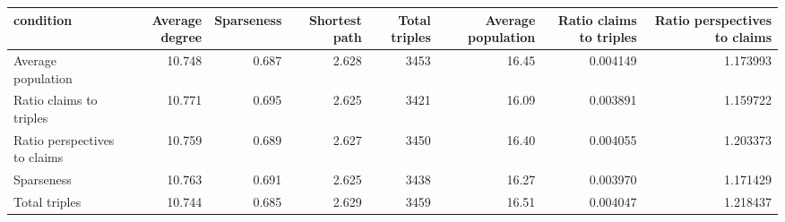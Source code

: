 \begin{tabular}{lrrrrrrr}
\toprule
                   condition &  Average degree &  Sparseness &  Shortest path &  Total triples &  Average population &  Ratio claims to triples &  Ratio perspectives to claims \\
\midrule
          Average population &          10.748 &       0.687 &          2.628 &           3453 &               16.45 &                 0.004149 &                      1.173993 \\
     Ratio claims to triples &          10.771 &       0.695 &          2.625 &           3421 &               16.09 &                 0.003891 &                      1.159722 \\
Ratio perspectives to claims &          10.759 &       0.689 &          2.627 &           3450 &               16.40 &                 0.004055 &                      1.203373 \\
                  Sparseness &          10.763 &       0.691 &          2.625 &           3438 &               16.27 &                 0.003970 &                      1.171429 \\
               Total triples &          10.744 &       0.685 &          2.629 &           3459 &               16.51 &                 0.004047 &                      1.218437 \\
\bottomrule
\end{tabular}
